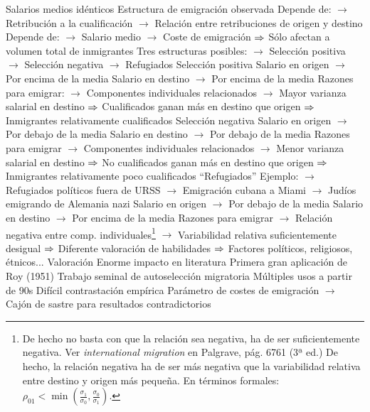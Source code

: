 \documentclass{nuevotema}
\begin{document}
\begin{esquemal}
				\4[] Salarios medios idénticos
				\4 Estructura de emigración observada
				\4[] Depende de:
				\4[] $\to$ Retribución a la cualificación
				\4[] $\to$ Relación entre retribuciones de origen y destino
				\4[] Depende de:
				\4[] $\to$ Salario medio
				\4[] $\to$ Coste de emigración
				\4[] $\Rightarrow$ Sólo afectan a volumen total de inmigrantes
				\4 Tres estructuras posibles:
				\4[] $\to$ Selección positiva
				\4[] $\to$ Selección negativa
				\4[] $\to$ Refugiados
				\4 Selección positiva
				\4[] Salario en origen
				\4[] $\to$ Por encima de la media
				\4[] Salario en destino
				\4[] $\to$ Por encima de la media
				\4[] Razones para emigrar:
				\4[] $\to$ Componentes individuales relacionados
				\4[] $\to$ Mayor varianza salarial en destino
				\4[] $\Rightarrow$ Cualificados ganan más en destino que origen
				\4[] $\Rightarrow$ Inmigrantes relativamente cualificados
				\4 Selección negativa
				\4[] Salario en origen
				\4[] $\to$ Por debajo de la media
				\4[] Salario en destino
				\4[] $\to$ Por debajo de la media
				\4[] Razones para emigrar
				\4[] $\to$ Componentes individuales relacionados
				\4[] $\to$ Menor varianza salarial en destino
				\4[] $\Rightarrow$ No cualificados ganan más en destino que origen
				\4[] $\Rightarrow$ Inmigrantes relativamente poco cualificados
				\4 ``Refugiados''
				\4[] Ejemplo:
				\4[] $\to$ Refugiados políticos fuera de URSS
				\4[] $\to$ Emigración cubana a Miami
				\4[] $\to$ Judíos emigrando de Alemania nazi
				\4[] Salario en origen
				\4[] $\to$ Por debajo de la media
				\4[] Salario en destino
				\4[] $\to$ Por encima de la media
				\4[] Razones para emigrar
				\4[] $\to$ Relación negativa entre comp. individuales\footnote{De hecho no basta con que la relación sea negativa, ha de ser suficientemente negativa. Ver \textit{international migration} en Palgrave, pág. 6761 (3ª ed.) De hecho, la relación negativa ha de ser más negativa que la variabilidad relativa entre destino y origen más pequeña. En términos formales: $\rho_{01} < \min \left(  \frac{\sigma_1}{\sigma_0} , \frac{\sigma_0}{\sigma_1} \right)$.}
				\4[] $\to$ Variabilidad relativa suficientemente desigual
				\4[] $\Rightarrow$ Diferente valoración de habilidades
				\4[] $\Rightarrow$ Factores políticos, religiosos, étnicos...
			\3 Valoración
				\4 Enorme impacto en literatura
				\4[] Primera gran aplicación de Roy (1951)
				\4[] Trabajo seminal de autoselección migratoria
				\4[] Múltiples usos a partir de 90s
				\4 Difícil contrastación empírica
				\4[] Parámetro de costes de emigración
				\4[] $\to$ Cajón de sastre para resultados contradictorios

\end{esquemal}
\end{document}
